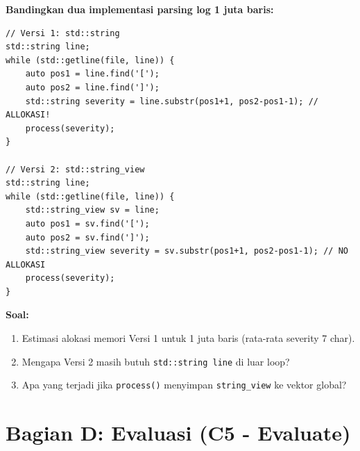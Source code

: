 \documentclass[12pt,a4paper]{article}
\begin{document}
\begin{tcolorbox}[colback=UBgreen!5, colframe=UBgreen, title=\textbf{C1. Analisis Performa: string vs string\_view (C4: Analyze)}]
\textbf{Bandingkan dua implementasi parsing log 1 juta baris:}

\begin{lstlisting}
// Versi 1: std::string
std::string line;
while (std::getline(file, line)) {
    auto pos1 = line.find('[');
    auto pos2 = line.find(']');
    std::string severity = line.substr(pos1+1, pos2-pos1-1); // ALLOKASI!
    process(severity);
}

// Versi 2: std::string_view
std::string line;
while (std::getline(file, line)) {
    std::string_view sv = line;
    auto pos1 = sv.find('[');
    auto pos2 = sv.find(']');
    std::string_view severity = sv.substr(pos1+1, pos2-pos1-1); // NO ALLOKASI
    process(severity);
}
\end{lstlisting}

\textbf{Soal:}
\begin{enumerate}[label=\alph*)]
  \item Estimasi alokasi memori Versi 1 untuk 1 juta baris (rata-rata severity 7 char).
  
  \vspace{2cm}
  
  \item Mengapa Versi 2 masih butuh \texttt{std::string line} di luar loop?
  
  \vspace{2cm}
  
  \item Apa yang terjadi jika \texttt{process()} menyimpan \texttt{string\_view} ke vektor global?
  
  \vspace{2cm}
\end{enumerate}
\end{tcolorbox}

\section*{Bagian D: Evaluasi (C5 - Evaluate)}
\end{document}

